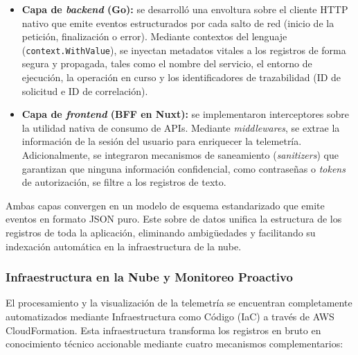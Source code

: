 \begin{itemize}
  \item \textbf{Capa de \textit{backend} (Go):} se desarrolló una envoltura sobre el cliente HTTP nativo que emite eventos estructurados por cada salto de red (inicio de la petición, finalización o error). Mediante contextos del lenguaje (\texttt{context.WithValue}), se inyectan metadatos vitales a los registros de forma segura y propagada, tales como el nombre del servicio, el entorno de ejecución, la operación en curso y los identificadores de trazabilidad (ID de solicitud e ID de correlación).

  \item \textbf{Capa de \textit{frontend} (BFF en Nuxt):} se implementaron interceptores sobre la utilidad nativa de consumo de APIs. Mediante \textit{middlewares}, se extrae la información de la sesión del usuario para enriquecer la telemetría. Adicionalmente, se integraron mecanismos de saneamiento (\textit{sanitizers}) que garantizan que ninguna información confidencial, como contraseñas o \textit{tokens} de autorización, se filtre a los registros de texto.
\end{itemize}

Ambas capas convergen en un modelo de esquema estandarizado que emite eventos en formato JSON puro. Este sobre de datos unifica la estructura de los registros de toda la aplicación, eliminando ambigüedades y facilitando su indexación automática en la infraestructura de la nube.

\subsubsection{Infraestructura en la Nube y Monitoreo Proactivo}

El procesamiento y la visualización de la telemetría se encuentran completamente automatizados mediante Infraestructura como Código (IaC) a través de AWS CloudFormation. Esta infraestructura transforma los registros en bruto en conocimiento técnico accionable mediante cuatro mecanismos complementarios:


